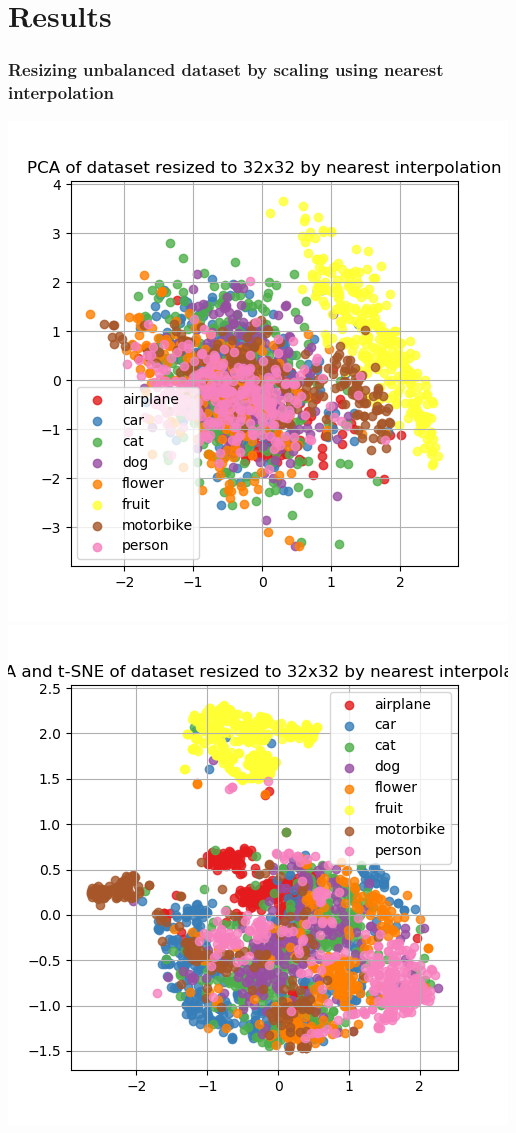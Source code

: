 \documentclass{article}
\begin{document}
\section{Results}

\begin{minipage}[c]{\textwidth}

\subsubsection{Resizing unbalanced dataset by scaling using nearest interpolation}

	\centering
	\includegraphics[width= \figureWidth\textwidth]{./figures/pca_h32_w32_r_none.png}
	\includegraphics[width= \figureWidth\textwidth]{./figures/pca_tsne_h32_w32_r_none.png}

\end{minipage}
\end{document}
